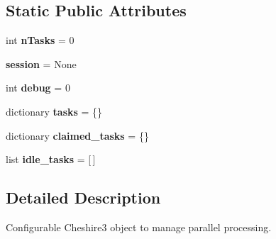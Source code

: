 \subsection*{Static Public Attributes}
\begin{DoxyCompactItemize}
\item 
\hypertarget{classcheshire3_1_1parallel_1_1mp_task_manager_1_1_process_task_manager_aee49df9eb3460a808cda069ebfa61393}{int {\bfseries n\-Tasks} = 0}\label{classcheshire3_1_1parallel_1_1mp_task_manager_1_1_process_task_manager_aee49df9eb3460a808cda069ebfa61393}

\item 
\hypertarget{classcheshire3_1_1parallel_1_1mp_task_manager_1_1_process_task_manager_a0c087ebb10f580be838c82705466ff45}{{\bfseries session} = None}\label{classcheshire3_1_1parallel_1_1mp_task_manager_1_1_process_task_manager_a0c087ebb10f580be838c82705466ff45}

\item 
\hypertarget{classcheshire3_1_1parallel_1_1mp_task_manager_1_1_process_task_manager_abb5d699b1853bdfc60210fb2e27e9097}{int {\bfseries debug} = 0}\label{classcheshire3_1_1parallel_1_1mp_task_manager_1_1_process_task_manager_abb5d699b1853bdfc60210fb2e27e9097}

\item 
\hypertarget{classcheshire3_1_1parallel_1_1mp_task_manager_1_1_process_task_manager_ad76e2b23531dc664bbd1e1a46e86395a}{dictionary {\bfseries tasks} = \{\}}\label{classcheshire3_1_1parallel_1_1mp_task_manager_1_1_process_task_manager_ad76e2b23531dc664bbd1e1a46e86395a}

\item 
\hypertarget{classcheshire3_1_1parallel_1_1mp_task_manager_1_1_process_task_manager_ae20930bba41ffd79ce6e934f17d3143f}{dictionary {\bfseries claimed\-\_\-tasks} = \{\}}\label{classcheshire3_1_1parallel_1_1mp_task_manager_1_1_process_task_manager_ae20930bba41ffd79ce6e934f17d3143f}

\item 
\hypertarget{classcheshire3_1_1parallel_1_1mp_task_manager_1_1_process_task_manager_a2230b7b51a942a2da5c171cac12fd3c5}{list {\bfseries idle\-\_\-tasks} = \mbox{[}$\,$\mbox{]}}\label{classcheshire3_1_1parallel_1_1mp_task_manager_1_1_process_task_manager_a2230b7b51a942a2da5c171cac12fd3c5}

\end{DoxyCompactItemize}


\subsection{Detailed Description}
\begin{DoxyVerb}Configurable Cheshire3 object to manage parallel processing.\end{DoxyVerb}
 

